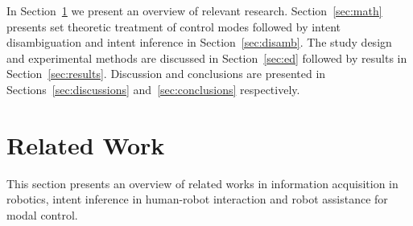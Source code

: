 \documentclass[conference]{IEEEtran}
\begin{document}

In Section~\ref{sec:related_work} we present an overview of relevant research. Section~\ref{sec:math} presents set theoretic treatment of control modes followed by intent disambiguation and intent inference in Section~\ref{sec:disamb}. The study design and experimental methods are discussed in Section~\ref{sec:ed} followed by results in Section~\ref{sec:results}. Discussion and conclusions are presented in Sections~\ref{sec:discussions} and~\ref{sec:conclusions} respectively. 


\section{Related Work}\label{sec:related_work}
This section presents an overview of related works in information acquisition in robotics, intent inference in human-robot interaction and robot assistance for modal control. 
%
\end{document}
